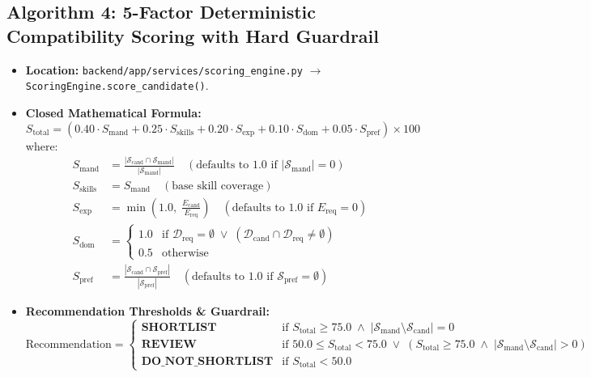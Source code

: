 \documentclass[11pt,a4paper]{report}
\begin{document}
\subsection{Algorithm 4: 5-Factor Deterministic Compatibility Scoring with Hard Guardrail}
\begin{itemize}[leftmargin=1.5em]
    \item \textbf{Location:} \texttt{backend/app/services/scoring\_engine.py} $\to$ \texttt{ScoringEngine.score\_candidate()}.
    \item \textbf{Closed Mathematical Formula:}
    \begin{equation}
        S_{\text{total}} = \left( 0.40 \cdot S_{\text{mand}} + 0.25 \cdot S_{\text{skills}} + 0.20 \cdot S_{\text{exp}} + 0.10 \cdot S_{\text{dom}} + 0.05 \cdot S_{\text{pref}} \right) \times 100
    \end{equation}
    where:
    \begin{align}
        S_{\text{mand}} &= \frac{|\mathcal{S}_{\text{cand}} \cap \mathcal{S}_{\text{mand}}|}{|\mathcal{S}_{\text{mand}}|} \quad (\text{defaults to } 1.0 \text{ if } |\mathcal{S}_{\text{mand}}| = 0) \\
        S_{\text{skills}} &= S_{\text{mand}} \quad (\text{base skill coverage}) \\
        S_{\text{exp}} &= \min\left(1.0, \; \frac{E_{\text{cand}}}{E_{\text{req}}}\right) \quad (\text{defaults to } 1.0 \text{ if } E_{\text{req}} = 0) \\
        S_{\text{dom}} &= \begin{cases} 1.0 & \text{if } \mathcal{D}_{\text{req}} = \emptyset \;\lor\; (\mathcal{D}_{\text{cand}} \cap \mathcal{D}_{\text{req}} \neq \emptyset) \\ 0.5 & \text{otherwise} \end{cases} \\
        S_{\text{pref}} &= \frac{|\mathcal{S}_{\text{cand}} \cap \mathcal{S}_{\text{pref}}|}{|\mathcal{S}_{\text{pref}}|} \quad (\text{defaults to } 1.0 \text{ if } \mathcal{S}_{\text{pref}} = \emptyset)
    \end{align}
    \item \textbf{Recommendation Thresholds \& Guardrail:}
    \begin{equation}
        \text{Recommendation} = \begin{cases}
            \textbf{SHORTLIST} & \text{if } S_{\text{total}} \ge 75.0 \;\land\; |\mathcal{S}_{\text{mand}} \setminus \mathcal{S}_{\text{cand}}| = 0 \\
            \textbf{REVIEW} & \text{if } 50.0 \le S_{\text{total}} < 75.0 \;\lor\; (S_{\text{total}} \ge 75.0 \;\land\; |\mathcal{S}_{\text{mand}} \setminus \mathcal{S}_{\text{cand}}| > 0) \\
            \textbf{DO\_NOT\_SHORTLIST} & \text{if } S_{\text{total}} < 50.0
        \end{cases}
    \end{equation}
\end{itemize}
\end{document}
